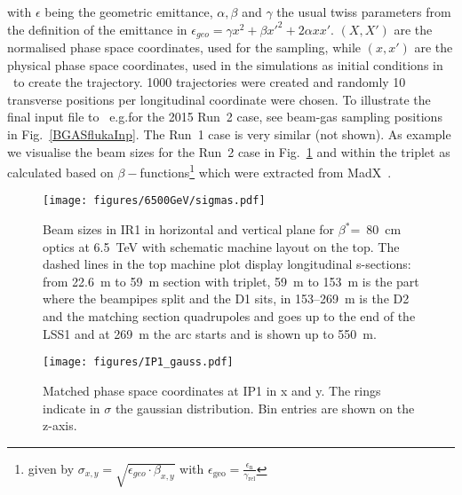 with $\epsilon$ being the geometric emittance, $\alpha, \beta$ and $\gamma$ the usual twiss parameters from the definition of the emittance in $\epsilon_{geo} = \gamma x^2 + \beta x'^2 + 2 \alpha x x'$. $(X,X')$ are the normalised phase space coordinates, used for the sampling, while $(x,x')$ are the physical phase space coordinates, used in the simulations as initial conditions in \fluka~to create the trajectory. 1000 trajectories were created and randomly 10 transverse positions per longitudinal coordinate were chosen. To illustrate the final input file to \fluka~e.g.for the 2015 Run~2 case, see beam-gas sampling positions in Fig.~\ref{BGASflukaInp}. The Run~1 case is very similar (not shown). As example we visualise the beam sizes for the Run~2 case in Fig.~\ref{twissfileBS} and within the triplet as calculated based on $\beta-$functions\footnote{given by $\sigma_{x,y} = \sqrt{\epsilon_{geo} \cdot \beta_{x,y}}$ with $\epsilon_{\textrm{geo}} = \frac{ \epsilon_{\textrm{n}}}{\gamma_{\textrm{rel}}}$} which were extracted from MadX~\cite{madx}.


\begin{figure}%
\begin{center}
  \texttt{[image: figures/6500GeV/sigmas.pdf]}
\end{center}
\vspace{-0.6cm}
 \caption{Beam sizes in IR1 in horizontal and vertical plane for $\beta^*$=~80~cm optics at 6.5~TeV with schematic machine layout on the top. The dashed lines in the top machine plot display longitudinal s-sections: from 22.6~m to 59~m section with triplet, 59~m to 153~m is the part where the beampipes split and the D1 sits, in 153--269~m is the D2 and the matching section quadrupoles and goes up to the end of the LSS1 and at 269~m the arc starts and is shown up to 550~m.
  \label{twissfileBS}}
\end{figure}
 

\begin{figure}%
\begin{center}
\texttt{[image: figures/IP1\_gauss.pdf]}
\end{center}
\vspace{-0.6cm}
 \caption{Matched phase space coordinates at IP1 in x and y. The rings indicate in $\sigma$ the gaussian distribution. Bin entries are shown on the z-axis.
  \label{ip1_gauss}}
\end{figure}


